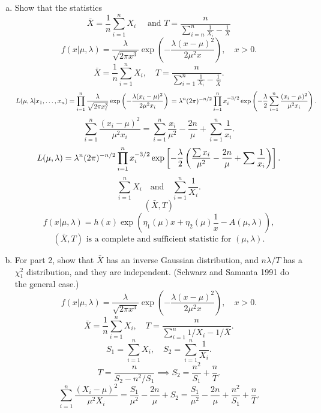 \documentclass{article}
\begin{document}
\begin{enumerate}[(a)]
	\item Show that the statistics
	      $$
		      \bar{X}= \frac{1}{n}\sum_{i=1}^{n}X_i \quad \text{ and } T=\frac{n}{\sum_{i=n}^{n} \frac{1}{X_i} - \frac{1}{X}}
	      $$
	      \[
		      f(x|\mu, \lambda) = \frac{\lambda}{\sqrt{2\pi x^3}} \exp\left( -\frac{\lambda (x-\mu)^2}{2 \mu^2 x} \right), \quad x>0.
	      \]
	      \[
		      \bar{X} = \frac{1}{n}\sum_{i=1}^n X_i, \quad
		      T = \frac{n}{\sum_{i=1}^{n} \frac{1}{X_i} - \frac{1}{\bar{X}} }.
	      \]
	      \[
		      L(\mu,\lambda|x_1,\dots,x_n) = \prod_{i=1}^n \frac{\lambda}{\sqrt{2\pi x_i^3}}
		      \exp\left(-\frac{\lambda (x_i-\mu)^2}{2 \mu^2 x_i}\right) \\
		      = \lambda^n (2\pi)^{-n/2} \prod_{i=1}^n x_i^{-3/2} \exp\left(-\frac{\lambda}{2} \\ \sum_{i=1}^n \frac{(x_i-\mu)^2}{\mu^2 x_i}\right).
	      \]
	      \[
		      \sum_{i=1}^n \frac{(x_i-\mu)^2}{\mu^2 x_i} = \sum_{i=1}^n \frac{x_i}{\mu^2} - \frac{2n}{\mu} + \sum_{i=1}^n \frac{1}{x_i}.
	      \]
	      \[
		      L(\mu,\lambda) = \lambda^n (2\pi)^{-n/2} \prod_{i=1}^n x_i^{-3/2} \\
		      \exp\left[-\frac{\lambda}{2} \left( \frac{\sum x_i}{\mu^2} - \frac{2n}{\mu} + \sum \frac{1}{x_i} \right)\right].
	      \]
	      \[
		      \sum_{i=1}^n X_i \quad \text{and} \quad \sum_{i=1}^n \frac{1}{X_i}.
	      \]
	      \[
		      (\bar{X}, T)
	      \]
	      \[
		      f(x|\mu,\lambda) = h(x) \exp\left( \eta_1(\mu) x + \eta_2(\mu) \frac{1}{x} - A(\mu, \lambda) \right),
	      \]
	      \[
		      \boxed{(\bar{X}, T) \text{ is a complete and sufficient statistic for } (\mu, \lambda).}
	      \]
	\item For part 2, show that $\bar{X}$ has an inverse Gaussian distribution, and $n \lambda/T$ has a $\chi^2_1$
	      distribution, and they are independent. (Schwarz and Samanta 1991 do the general case.)
	      \[
		      f(x|\mu, \lambda) = \frac{\lambda}{\sqrt{2\pi x^3}} \exp\left( -\frac{\lambda (x-\mu)^2}{2 \mu^2 x} \right), \quad x>0.
	      \]
	      \[
		      \bar{X} = \frac{1}{n} \sum_{i=1}^n X_i, \quad
		      T = \frac{n}{\sum_{i=1}^{n} 1/X_i - 1/\bar{X} }.
	      \]
	      \[
		      S_1 = \sum_{i=1}^n X_i, \quad S_2 = \sum_{i=1}^n \frac{1}{X_i}.
	      \]
	      \[
		      T = \frac{n}{S_2 - n^2/S_1} \implies S_2 = \frac{n^2}{S_1} + \frac{n}{T}.
	      \]
	      \[
		      \sum_{i=1}^n \frac{(X_i-\mu)^2}{\mu^2 X_i} = \frac{S_1}{\mu^2} - \frac{2n}{\mu} + S_2 = \frac{S_1}{\mu^2} - \frac{2n}{\mu} + \frac{n^2}{S_1} + \frac{n}{T}.
\]
\end{enumerate}
\end{document}
